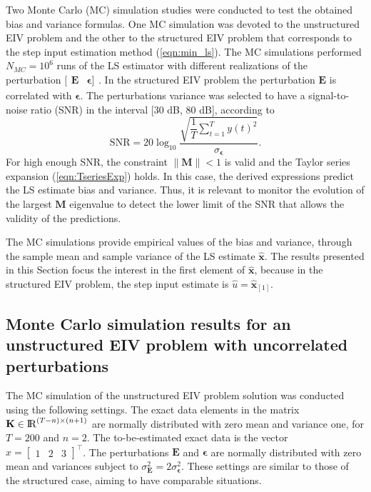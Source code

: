 Two Monte Carlo (MC) simulation studies were conducted to test the obtained bias and variance formulas.
One MC simulation was devoted to the unstructured EIV problem and the other to the structured EIV problem that corresponds to the step input estimation method (\ref{eqn:min_ls}).
The MC simulations performed $N_{MC} = 10^6$ runs of the LS estimator with different realizations of the perturbation $[\begin{matrix} \mathbf{E} & \bm{\epsilon}] \end{matrix}$.
In the structured EIV problem the perturbation $\mathbf{E}$ is correlated with $\bm{\epsilon}$.
The perturbations variance was selected to have a signal-to-noise ratio (SNR) in the interval [30 dB, 80 dB], according to 
\begin{equation} \mathrm{SNR} = 20 \log_{10}{ \dfrac{ \sqrt{ \dfrac{1}{T} \sum\limits_{t=1}^{T}{ y(t)^2 } } }{ \sigma_{ \bm{\epsilon}}} } . \end{equation} 
For high enough SNR, the constraint $\| \mathbf{M} \| < 1$ is valid and the Taylor series expansion  (\ref{eqn:TseriesExp}) holds. 
In this case, the derived expressions predict the LS estimate bias and variance.
Thus, it is relevant to monitor the evolution of the largest $\mathbf{M}$ eigenvalue to detect the lower limit of the SNR  that allows the validity of the predictions.

The MC simulations provide empirical values of the bias and variance, through the sample mean and sample variance of the LS estimate $\widehat{\mathbf{x}}$.
The results presented in this Section focus the interest in the first element of $\widehat{\mathbf{x}}$, because in the structured EIV problem, the step input estimate is $\widehat{u} = \widehat{\mathbf{x}}_{\left[1\right]}$.

\subsection{Monte Carlo simulation results for an unstructured EIV problem with uncorrelated perturbations}

The MC simulation of the unstructured EIV problem solution was conducted using the following settings.
The exact data elements in the matrix $\mathbf{K} \in {\rm I\!R}^{\left(T-n\right) \times \left(n+1\right)}$  are normally distributed with zero mean and variance one, for $T = 200$ and $n = 2$.
The to-be-estimated exact data is the vector $x = \begin{bmatrix} 1 & 2 & 3 \end{bmatrix}^\top$.
The perturbations $\mathbf{E}$ and $\bm{\epsilon}$ are normally distributed with zero mean and variances subject to $\sigma_{\mathbf{E}}^2 = 2 \sigma_{\bm{\epsilon}}^2$.
These settings are similar to those of the structured case, aiming to have comparable situations.


